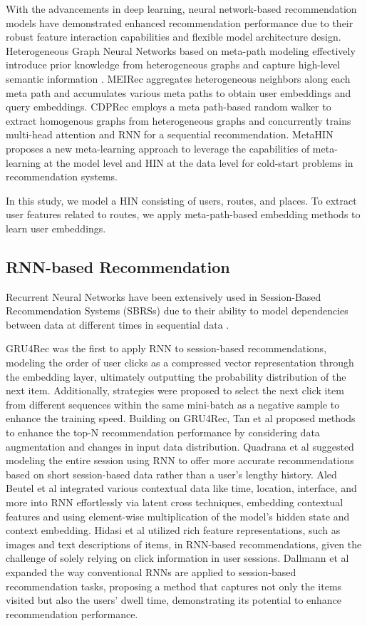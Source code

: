 \documentclass[]{article}
\begin{document}
With the advancements in deep learning, neural network-based recommendation models have demonstrated enhanced recommendation performance due to their robust feature interaction capabilities and flexible model architecture design. Heterogeneous Graph Neural Networks based on meta-path modeling effectively introduce prior knowledge from heterogeneous graphs and capture high-level semantic information \cite{Liu2022}. MEIRec \cite{Fan2019} aggregates heterogeneous neighbors along each meta path and accumulates various meta paths to obtain user embeddings and query embeddings. CDPRec \cite{Sang2021} employs a meta path-based random walker to extract homogenous graphs from heterogeneous graphs and concurrently trains multi-head attention and RNN for a sequential recommendation. MetaHIN \cite{Lu2020} proposes a new meta-learning approach to leverage the capabilities of meta-learning at the model level and HIN at the data level for cold-start problems in recommendation systems.

In this study, we model a HIN consisting of users, routes, and places. To extract user features related to routes, we apply meta-path-based embedding methods to learn user embeddings.

\subsection{RNN-based Recommendation} 
Recurrent Neural Networks have been extensively used in Session-Based Recommendation Systems (SBRSs) due to their ability to model dependencies between data at different times in sequential data \cite{10.1145/3465401}. 

GRU4Rec \cite{Hidasi2016} was the first to apply RNN to session-based recommendations, modeling the order of user clicks as a compressed vector representation through the embedding layer, ultimately outputting the probability distribution of the next item. Additionally, strategies were proposed to select the next click item from different sequences within the same mini-batch as a negative sample to enhance the training speed. Building on GRU4Rec, Tan et al \cite{Tan2016} proposed methods to enhance the top-N recommendation performance by considering data augmentation and changes in input data distribution. Quadrana et al \cite{10.1145/3109859.3109896} suggested modeling the entire session using RNN to offer more accurate recommendations based on short session-based data rather than a user's lengthy history. Aled Beutel et al \cite{10.1145/3159652.3159727} integrated various contextual data like time, location, interface, and more into RNN effortlessly via latent cross techniques, embedding contextual features and using element-wise multiplication of the model's hidden state and context embedding. Hidasi et al \cite{Hidasi2016a} utilized rich feature representations, such as images and text descriptions of items, in RNN-based recommendations, given the challenge of solely relying on click information in user sessions. Dallmann et al \cite{Dallmann2017} expanded the way conventional RNNs are applied to session-based recommendation tasks, proposing a method that captures not only the items visited but also the users' dwell time, demonstrating its potential to enhance recommendation performance. 
\end{document}

